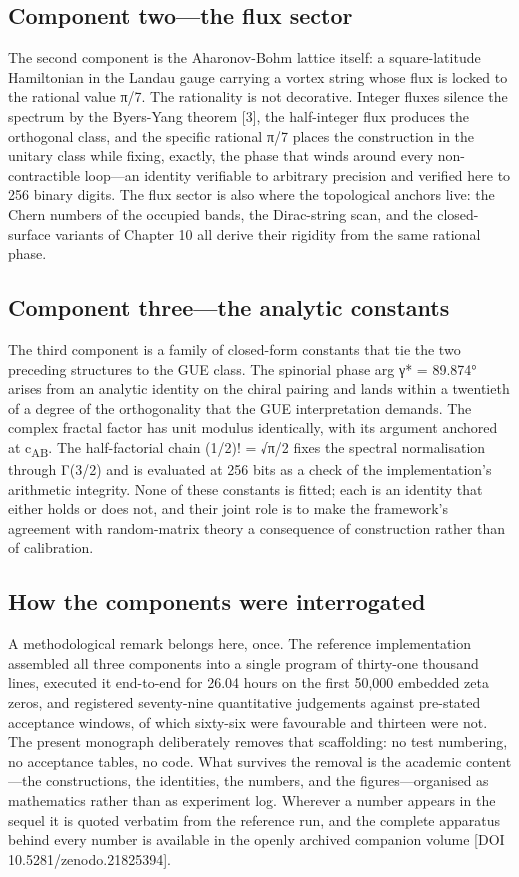 \documentclass[10pt]{article}
\begin{document}
\subsection{Component two---the flux sector}\label{sec:32}
The second component is the Aharonov-Bohm lattice itself: a square-latitude Hamiltonian in the Landau gauge carrying a vortex string whose flux is locked to the rational value π/7. The rationality is not decorative. Integer fluxes silence the spectrum by the Byers-Yang theorem [3], the half-integer flux produces the orthogonal class, and the specific rational π/7 places the construction in the unitary class while fixing, exactly, the phase that winds around every non-contractible loop---an identity verifiable to arbitrary precision and verified here to 256 binary digits. The flux sector is also where the topological anchors live: the Chern numbers of the occupied bands, the Dirac-string scan, and the closed-surface variants of Chapter 10 all derive their rigidity from the same rational phase.

\subsection{Component three---the analytic constants}\label{sec:33}
The third component is a family of closed-form constants that tie the two preceding structures to the GUE class. The spinorial phase arg γ* = 89.874° arises from an analytic identity on the chiral pairing and lands within a twentieth of a degree of the orthogonality that the GUE interpretation demands. The complex fractal factor has unit modulus identically, with its argument anchored at c\textsubscript{AB}. The half-factorial chain (1/2)! = √π/2 fixes the spectral normalisation through Γ(3/2) and is evaluated at 256 bits as a check of the implementation's arithmetic integrity. None of these constants is fitted; each is an identity that either holds or does not, and their joint role is to make the framework's agreement with random-matrix theory a consequence of construction rather than of calibration.

\subsection{How the components were interrogated}\label{sec:34}
A methodological remark belongs here, once. The reference implementation assembled all three components into a single program of thirty-one thousand lines, executed it end-to-end for 26.04 hours on the first 50,000 embedded zeta zeros, and registered seventy-nine quantitative judgements against pre-stated acceptance windows, of which sixty-six were favourable and thirteen were not. The present monograph deliberately removes that scaffolding: no test numbering, no acceptance tables, no code. What survives the removal is the academic content---the constructions, the identities, the numbers, and the figures---organised as mathematics rather than as experiment log. Wherever a number appears in the sequel it is quoted verbatim from the reference run, and the complete apparatus behind every number is available in the openly archived companion volume [DOI 10.5281/zenodo.21825394].
\end{document}
